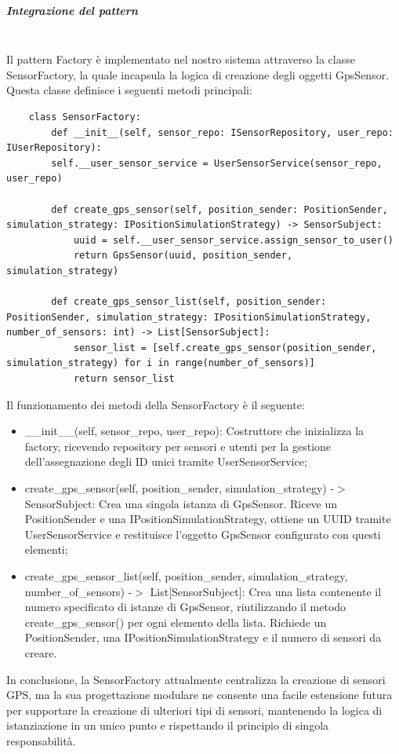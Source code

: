 \documentclass[10pt]{article}
\newcommand{\mysubparagraph}[1]{\subparagraph{#1}\mbox{}\\}
\begin{document}
    \mysubparagraph{Integrazione del pattern}
    Il pattern Factory è implementato nel nostro sistema attraverso la classe SensorFactory, la quale incapsula la logica di creazione degli oggetti GpsSensor. Questa classe definisce i seguenti metodi principali:
    \begin{lstlisting}
    class SensorFactory:
        def __init__(self, sensor_repo: ISensorRepository, user_repo: IUserRepository):
        self.__user_sensor_service = UserSensorService(sensor_repo, user_repo)

        def create_gps_sensor(self, position_sender: PositionSender, simulation_strategy: IPositionSimulationStrategy) -> SensorSubject:
            uuid = self.__user_sensor_service.assign_sensor_to_user()
            return GpsSensor(uuid, position_sender, simulation_strategy)

        def create_gps_sensor_list(self, position_sender: PositionSender, simulation_strategy: IPositionSimulationStrategy, number_of_sensors: int) -> List[SensorSubject]:
            sensor_list = [self.create_gps_sensor(position_sender, simulation_strategy) for i in range(number_of_sensors)]
            return sensor_list
    \end{lstlisting}
    Il funzionamento dei metodi della SensorFactory è il seguente:
    \begin{itemize}
        \item \_\_init\_\_(self, sensor\_repo, user\_repo): Costruttore che inizializza la factory, ricevendo repository per sensori e utenti per la gestione dell'assegnazione degli ID unici tramite UserSensorService;
        \item create\_gps\_sensor(self, position\_sender, simulation\_strategy) -$>$ SensorSubject: Crea una singola istanza di GpsSensor. Riceve un PositionSender e una IPositionSimulationStrategy, ottiene un UUID tramite UserSensorService e restituisce l'oggetto GpsSensor configurato con questi elementi;
        \item create\_gps\_sensor\_list(self, position\_sender, simulation\_strategy, number\_of\_sensors) -$>$ List[SensorSubject]: Crea una lista contenente il numero specificato di istanze di GpsSensor, riutilizzando il metodo create\_gps\_sensor() per ogni elemento della lista. Richiede un PositionSender, una IPositionSimulationStrategy e il numero di sensori da creare.
    \end{itemize}
In conclusione, la SensorFactory attualmente centralizza la creazione di sensori GPS, ma la sua progettazione modulare ne consente una facile estensione futura per supportare la creazione di ulteriori tipi di sensori, mantenendo la logica di istanziazione in un unico punto e rispettando il principio di singola responsabilità.
\end{document}
